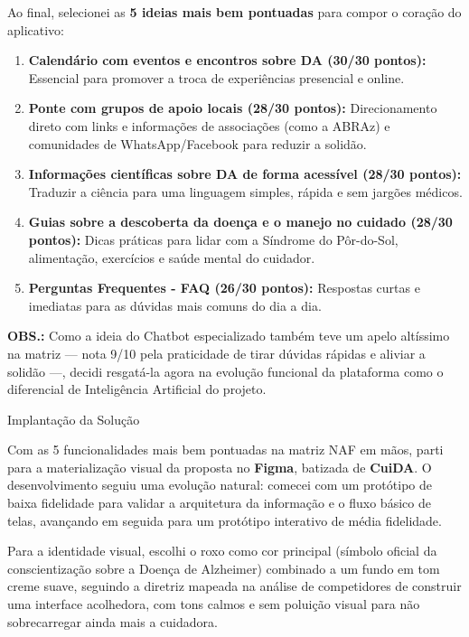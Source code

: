 \documentclass[11pt,a4paper]{article}
\newcommand{\subtituloSecao}[1]{%
  \par\addvspace{10pt}%
  {\noindent\fontsize{16pt}{20pt}\selectfont\normalfont\color{headingBlue}#1\par}%
  \vspace{3pt}%
}
\begin{document}
\hspace*{1.25cm}Ao final, selecionei as \textbf{5 ideias mais bem pontuadas} para compor o coração do aplicativo:

\begin{enumerate}[leftmargin=1.25cm, topsep=2pt, itemsep=6pt]
  \item \textbf{Calendário com eventos e encontros sobre DA (30/30 pontos):} Essencial para promover a troca de experiências presencial e online.
  \item \textbf{Ponte com grupos de apoio locais (28/30 pontos):} Direcionamento direto com links e informações de associações (como a ABRAz) e comunidades de WhatsApp/Facebook para reduzir a solidão.
  \item \textbf{Informações científicas sobre DA de forma acessível (28/30 pontos):} Traduzir a ciência para uma linguagem simples, rápida e sem jargões médicos.
  \item \textbf{Guias sobre a descoberta da doença e o manejo no cuidado (28/30 pontos):} Dicas práticas para lidar com a Síndrome do Pôr-do-Sol, alimentação, exercícios e saúde mental do cuidador.
  \item \textbf{Perguntas Frequentes - FAQ (26/30 pontos):} Respostas curtas e imediatas para as dúvidas mais comuns do dia a dia.
\end{enumerate}

\textbf{OBS.:} Como a ideia do Chatbot especializado também teve um apelo altíssimo na matriz — nota 9/10 pela praticidade de tirar dúvidas rápidas e aliviar a solidão —, decidi resgatá-la agora na evolução funcional da plataforma como o diferencial de Inteligência Artificial do projeto.

\subtituloSecao{Implantação da Solução}

Com as 5 funcionalidades mais bem pontuadas na matriz NAF em mãos, parti para a materialização visual da proposta no \textbf{Figma}, batizada de \textbf{CuiDA}. O desenvolvimento seguiu uma evolução natural: comecei com um protótipo de baixa fidelidade para validar a arquitetura da informação e o fluxo básico de telas, avançando em seguida para um protótipo interativo de média fidelidade.

Para a identidade visual, escolhi o roxo como cor principal (símbolo oficial da conscientização sobre a Doença de Alzheimer) combinado a um fundo em tom creme suave, seguindo a diretriz mapeada na análise de competidores de construir uma interface acolhedora, com tons calmos e sem poluição visual para não sobrecarregar ainda mais a cuidadora.
\end{document}
